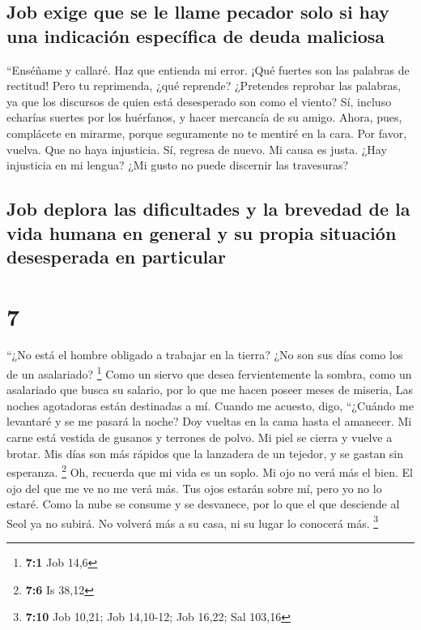 \hypertarget{job-exige-que-se-le-llame-pecador-solo-si-hay-una-indicaciuxf3n-especuxedfica-de-deuda-maliciosa}{%
\subsection{Job exige que se le llame pecador solo si hay una indicación
específica de deuda
maliciosa}\label{job-exige-que-se-le-llame-pecador-solo-si-hay-una-indicaciuxf3n-especuxedfica-de-deuda-maliciosa}}

 ``Enséñame y callaré. Haz que entienda mi error.
 ¡Qué fuertes son las palabras de rectitud! Pero tu
reprimenda, ¿qué reprende?  ¿Pretendes reprobar las
palabras, ya que los discursos de quien está desesperado son como el
viento?  Sí, incluso echarías suertes por los huérfanos,
y hacer mercancía de su amigo.  Ahora, pues, complácete
en mirarme, porque seguramente no te mentiré en la cara. 
Por favor, vuelva. Que no haya injusticia. Sí, regresa de nuevo. Mi
causa es justa.  ¿Hay injusticia en mi lengua? ¿Mi gusto
no puede discernir las travesuras?

\hypertarget{job-deplora-las-dificultades-y-la-brevedad-de-la-vida-humana-en-general-y-su-propia-situaciuxf3n-desesperada-en-particular}{%
\subsection{Job deplora las dificultades y la brevedad de la vida humana
en general y su propia situación desesperada en
particular}\label{job-deplora-las-dificultades-y-la-brevedad-de-la-vida-humana-en-general-y-su-propia-situaciuxf3n-desesperada-en-particular}}

\hypertarget{section-6}{%
\section{7}\label{section-6}}

 ``¿No está el hombre obligado a trabajar en la tierra?
¿No son sus días como los de un asalariado? \footnote{\textbf{7:1} Job
  14,6}  Como un siervo que desea fervientemente la
sombra, como un asalariado que busca su salario,  por lo
que me hacen poseer meses de miseria, Las noches agotadoras están
destinadas a mí.  Cuando me acuesto, digo, ``¿Cuándo me
levantaré y se me pasará la noche? Doy vueltas en la cama hasta el
amanecer.  Mi carne está vestida de gusanos y terrones de
polvo. Mi piel se cierra y vuelve a brotar.  Mis días son
más rápidos que la lanzadera de un tejedor, y se gastan sin esperanza.
\footnote{\textbf{7:6} Is 38,12}  Oh, recuerda que mi vida
es un soplo. Mi ojo no verá más el bien.  El ojo del que
me ve no me verá más. Tus ojos estarán sobre mí, pero yo no lo estaré.
 Como la nube se consume y se desvanece, por lo que el que
desciende al Seol ya no subirá.  No volverá más a su
casa, ni su lugar lo conocerá más. \footnote{\textbf{7:10} Job 10,21;
  Job 14,10-12; Job 16,22; Sal 103,16}

